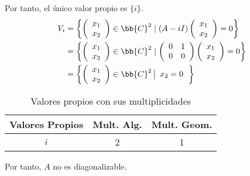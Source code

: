 \begin{ejercicio}
\begin{enumerate}
\begin{itemize}
        Por tanto, el único valor propio es $\{i\}$.
        \begin{equation*}\begin{split}
               V_{i} & = \left\{ \left(\begin{array}{c}
                    x_1 \\
                    x_2 \\
               \end{array}\right) \in \bb{C}^2 \mid (A-iI)\left(\begin{array}{c}
                    x_1 \\
                    x_2 \\
               \end{array}\right) = 0 \right\} \\
               & = \left\{ \left(\begin{array}{c}
                    x_1 \\
                    x_2 \\
               \end{array}\right) \in \bb{C}^2 \mid \left( \begin{array}{cc}
                0 & 1 \\
                0 & 0
            \end{array}\right) \left(\begin{array}{c}
                    x_1 \\
                    x_2 \\
               \end{array}\right) = 0 \right\} \\
               & = \left\{ \left(\begin{array}{c}
                    x_1 \\
                    x_2  \\
               \end{array}\right) \in \bb{C}^2 \left| \begin{array}{c}
                    x_2=0 \\
               \end{array}\right. \right\}
       \end{split}\end{equation*}
       \begin{table}[H]
            \centering
            \begin{tabular}{c|c|c}
                Valores Propios & Mult. Alg. & Mult. Geom. \\ \hline 
                $i$ & 2 & 1\\
            \end{tabular}
            \caption{Valores propios con sus multiplicidades}
        \end{table}

        Por tanto, $A$ no es diagonalizable.
    \end{itemize}
\end{enumerate}
    
\end{ejercicio}

